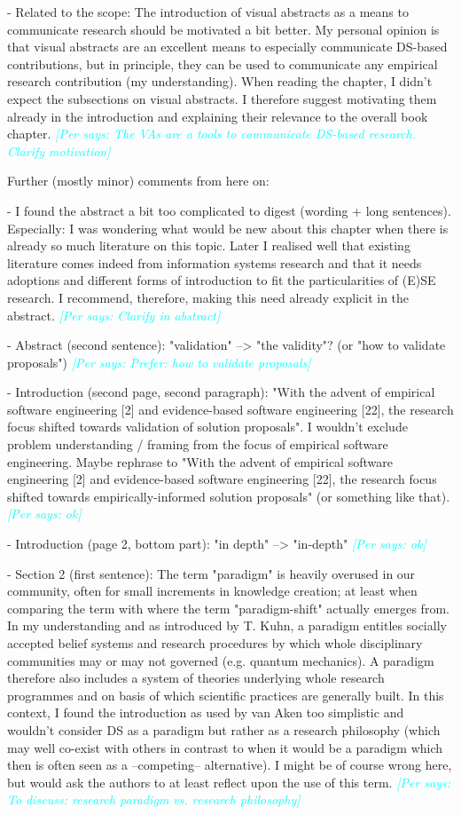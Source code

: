 \documentclass{article}
\newcommand{\per}[1]{\textcolor{cyan}{{\it [Per says: #1]}}}
\newcommand{\per}[1]{}
\begin{document}
- Related to the scope: The introduction of visual abstracts as a means to communicate research should be motivated a bit better. My personal opinion is that visual abstracts are an excellent means to especially communicate DS-based contributions, but in principle, they can be used to communicate any empirical research contribution (my understanding). When reading the chapter, I didn't expect the subsections on visual abstracts. I therefore suggest motivating them already in the introduction and explaining their relevance to the overall book chapter. \per{The VAs are a tools to communicate DS-based research. Clarify motivation}


Further (mostly minor) comments from here on:

- I found the abstract a bit too complicated to digest (wording + long sentences). Especially: I was wondering what would be new about this chapter when there is already so much literature on this topic. Later I realised well that existing literature comes indeed from information systems research and that it needs adoptions and different forms of introduction to fit the particularities of (E)SE research. I recommend, therefore, making this need already explicit in the abstract. \per{Clarify in abstract}

- Abstract (second sentence): "validation" --> "the validity"? (or "how to validate proposals") \per{Prefer: how to validate proposals}

- Introduction (second page, second paragraph): "With the advent of empirical software engineering [2] and evidence-based software engineering [22], the research focus shifted towards validation of solution proposals". I wouldn't exclude problem understanding / framing from the focus of empirical software engineering. Maybe rephrase to "With the advent of empirical software engineering [2] and evidence-based software engineering [22], the research focus shifted towards empirically-informed solution proposals" (or something like that). \per{ok}

- Introduction (page 2, bottom part): "in depth" --> "in-depth"  \per{ok}

- Section 2 (first sentence): The term "paradigm" is heavily overused in our community, often for small increments in knowledge creation; at least when comparing the term with  where the term "paradigm-shift" actually emerges from. In my understanding and as introduced by T. Kuhn, a paradigm entitles socially accepted belief systems and research procedures by which whole disciplinary communities may or may not governed (e.g. quantum mechanics). A paradigm therefore also includes a system of theories underlying whole research programmes and on basis of which scientific practices are generally built. In this context, I found the introduction as used by van Aken too simplistic and wouldn't consider DS as a paradigm but rather as a research philosophy (which may well co-exist with others in contrast to when it would be a paradigm which then is often seen as a --competing-- alternative). I might be of course wrong here, but would ask the authors to at least reflect upon the use of this term. \per{To discuss: research paradigm vs. research philosophy}
\end{document}
